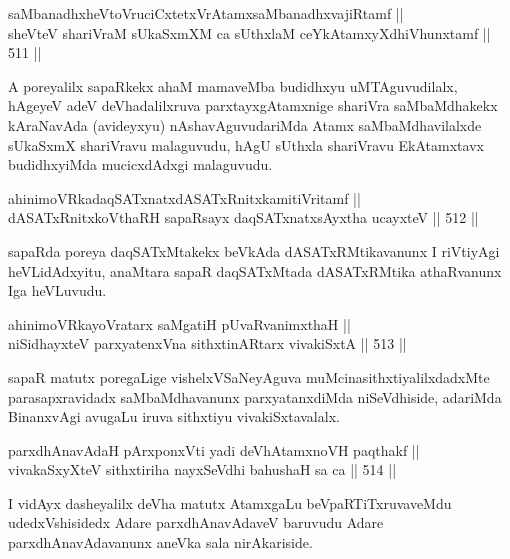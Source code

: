 \begin{shl}
saMbanadhxheVtoVruciCxtetxVrAtamxsaMbanadhxvajiRtamf || \\
sheVteV shariVraM sUkaSxmXM ca sUthxlaM ceYkAtamxyXdhiVhunxtamf \hfill || 511 ||  
\end{shl}

\begin{artha}
A poreyalilx sapaRkekx ahaM mamaveMba budidhxyu uMTAguvudilalx,
hAgeyeV adeV deVhadalilxruva parxtayxgAtamxnige shariVra saMbaMdhakekx
kAraNavAda (avideyxyu) nAshavAguvudariMda Atamx saMbaMdhavilalxde
sUkaSxmX shariVravu malaguvudu, hAgU sUthxla shariVravu EkAtamxtavx
budidhxyiMda mucicxdAdxgi malaguvudu.
\end{artha}

\begin{shl}
ahinimoVRkadaqSATxnatxdASATxRnitxkamitiVritamf ||  \\
dASATxRnitxkoV\s thaRH sapaRsayx daqSATxnatxsAyxtha ucayxteV \hfill || 512 ||  
\end{shl}

\begin{artha}
sapaRda poreya daqSATxMtakekx beVkAda dASATxRMtikavanunx I riVtiyAgi
heVLidAdxyitu, anaMtara sapaR daqSATxMtada dASATxRMtika athaRvanunx
Iga heVLuvudu.
\end{artha}


\begin{shl}
ahinimoVRkayoVratarx saMgatiH pUvaRvanimxthaH || \\
niSidhayxteV parxyatenxVna sithxtinARtarx vivakiSxtA \hfill || 513 ||  
\end{shl}

\begin{artha}
sapaR matutx poregaLige vishelxVSaNeyAguva muMcinasithxtiyalilxdadxMte
parasapxravidadx saMbaMdhavanunx parxyatanxdiMda niSeVdhiside,
adariMda BinanxvAgi avugaLu iruva sithxtiyu vivakiSxtavalalx.
\end{artha}

\begin{shl}
parxdhAnavAdaH pArxponxVti yadi deVhAtamxnoVH paqthakf || \\
vivakaSxyXteV sithxtiriha nayxSeVdhi bahushaH sa ca \hfill || 514 ||  
\end{shl}

\begin{artha}
I vidAyx dasheyalilx deVha matutx AtamxgaLu beVpaRTiTxruvaveMdu
udedxVshisidedx Adare parxdhAnavAdaveV baruvudu Adare
parxdhAnavAdavanunx aneVka sala nirAkariside.
\end{artha}

